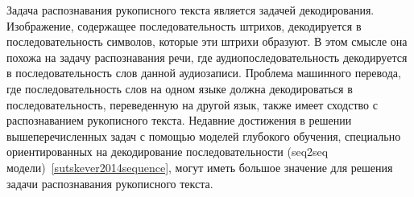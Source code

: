 Задача распознавания рукописного текста является задачей декодирования.
Изображение, содержащее последовательность штрихов, декодируется в последовательность символов, которые эти штрихи образуют.
В этом смысле она похожа на задачу распознавания речи, где аудиопоследовательность декодируется в последовательность слов данной аудиозаписи.
Проблема машинного перевода, где последовательность слов на одном языке должна декодироваться в последовательность,
переведенную на другой язык, также имеет сходство с распознаванием рукописного текста.
Недавние достижения в решении вышеперечисленных задач с помощью моделей глубокого обучения,
специально ориентированных на декодирование последовательности (seq2seq модели)~\ref{sutskever2014sequence},
могут иметь большое значение для решения задачи распознавания рукописного текста.
